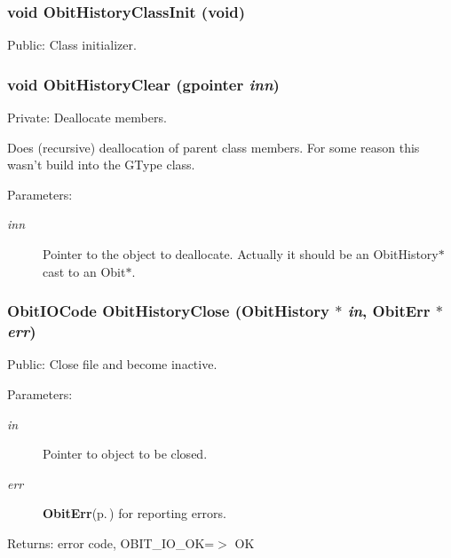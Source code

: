 \subsubsection{\setlength{\rightskip}{0pt plus 5cm}void Obit\-History\-Class\-Init (void)}\label{ObitHistory_8c_a22}


Public: Class initializer. 

\subsubsection{\setlength{\rightskip}{0pt plus 5cm}void Obit\-History\-Clear (gpointer {\em inn})}\label{ObitHistory_8c_a4}


Private: Deallocate members. 

Does (recursive) deallocation of parent class members. For some reason this wasn't build into the GType class. \begin{Desc}
\item[Parameters:]
\begin{description}
\item[{\em inn}]Pointer to the object to deallocate. Actually it should be an Obit\-History$\ast$ cast to an Obit$\ast$. \end{description}
\end{Desc}
\subsubsection{\setlength{\rightskip}{0pt plus 5cm}Obit\-IOCode Obit\-History\-Close ({\bf Obit\-History} $\ast$ {\em in}, {\bf Obit\-Err} $\ast$ {\em err})}\label{ObitHistory_8c_a16}


Public: Close file and become inactive. 

\begin{Desc}
\item[Parameters:]
\begin{description}
\item[{\em in}]Pointer to object to be closed. \item[{\em err}]{\bf Obit\-Err}{\rm (p.\,\pageref{structObitErr})} for reporting errors. \end{description}
\end{Desc}
\begin{Desc}
\item[Returns:]error code, OBIT\_\-IO\_\-OK=$>$ OK \end{Desc}
